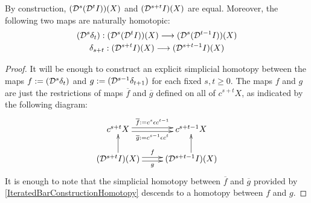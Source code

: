 \documentclass[10pt]{article}
\begin{document}
\begin{convergence}
\begin{lem}\label{DsDt=Dt+s}
By construction, $(\mathcal{D}^{\smash{s}}(\mathcal{D}^{\smash{t}}I))(X)$ and $(\mathcal{D}^{\smash{s+t}}I){(X)}$ are equal. Moreover, the following two maps are naturally homotopic:
\begin{gather*}
(\mathcal{D}^{\smash{s}}\delta_t):(\mathcal{D}^{\smash{s}}(\mathcal{D}^{\smash{t}}I))(X)\longrightarrow (\mathcal{D}^{\smash{s}}(\mathcal{D}^{\smash{t-1}}I))(X)\\
\delta_{s+t}:(\mathcal{D}^{\smash{s+t}}I){(X)}\longrightarrow (\mathcal{D}^{\smash{s+t-1}}I){(X)}
\end{gather*}
\end{lem}
\begin{proof}
It will be enough to construct an explicit simplicial homotopy between the maps $f:=(\mathcal{D}^{\smash{s}}\delta_t)$ and $g:=(\mathcal{D}^{\smash{s-1}}\delta_{t+1})$ for each fixed $s,t\geq0$. The maps $f$ and $g$ are just the restrictions of maps $\overline{f}$ and $\overline{g}$ defined on all of $c^{s+t}X$, as indicated by the following diagram:
\[\xymatrix@R=7mm{
c^{s+t}X
\ar@<.5ex>[r]^-{\overline{f}:=c^s\epsilon c^{t-1}}
\ar@<-.5ex>[r]_-{\overline{g}:=c^{s-1}\epsilon c^{t}}
&%
c^{s+t-1}X\\%
(\caldup{s+t}I)(X)
\ar@<.5ex>[r]^-{f}
\ar@<-.5ex>[r]_-{g}
\ar[u]
&%
(\caldup{s+t-1}I)(X)
\ar[u]
}\]
It is enough to note that the simplicial homotopy between $\overline{f}$ and $\overline{g}$ provided by \ref{IteratedBarConstructionHomotopy} descends to a homotopy between $f$ and $g$.
\end{proof}


\end{convergence}
\end{document}
